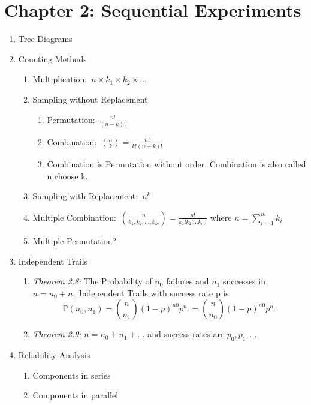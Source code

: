 \section*{Chapter 2: Sequential Experiments}
\begin{enumerate}
    \item Tree Diagrams
    \item Counting Methods
    \begin{enumerate}
        \item Multiplication:~$n\times k_1\times k_2\times \ldots$
        \item Sampling without Replacement
        \begin{enumerate}
            \item Permutation:~$\frac{n!}{(n-k)!}$
            \item Combination:~$\binom{n}{k}=\frac{n!}{k!(n-k)!}$
            \item Combination is Permutation without order. Combination is also called n choose k.
        \end{enumerate}
        \item Sampling with Replacement:~$n^k$
        \item Multiple Combination:~$\binom{n}{k_1,k_2,\ldots,k_m}=\frac{n!}{k_1!k_2!\ldots k_m!}$ where $n=\sum_{i=1}^{m}k_i$
        \item Multiple Permutation?
    \end{enumerate}
    \item Independent Trails
    \begin{enumerate}
        \item \textit{Theorem 2.8:} The Probability of $n_0$ failures and $n_1$ successes in $n=n_0+n_1$ Independent Trails with success rate p is \[\mathbb{P}(n_0, n_1)=\binom{n}{n_1}(1-p)^{n0}p^{n_1}=\binom{n}{n_0}(1-p)^{n0}p^{n_1}\]
        \item \textit{Theorem 2.9:} $n=n_0+n_1+\ldots$ and success rates are $p_0, p_1,\ldots$
    \end{enumerate}
    \item Reliability Analysis
    \begin{enumerate}
        \item Components in series
        \item Components in parallel
    \end{enumerate}
\end{enumerate}